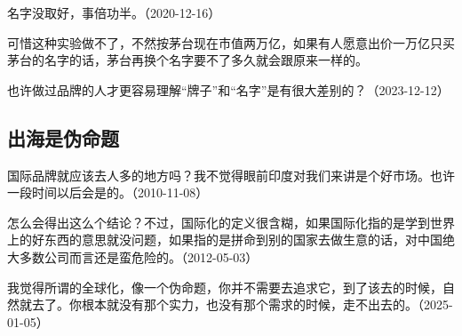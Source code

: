 名字没取好，事倍功半。（2020-12-16）


可惜这种实验做不了，不然按茅台现在市值两万亿，如果有人愿意出价一万亿只买茅台的名字的话，茅台再换个名字要不了多久就会跟原来一样的。

也许做过品牌的人才更容易理解“牌子”和“名字”是有很大差别的？（2023-12-12）

\subsection{出海是伪命题}


国际品牌就应该去人多的地方吗？我不觉得眼前印度对我们来讲是个好市场。也许一段时间以后会是的。（2010-11-08）


怎么会得出这么个结论？不过，国际化的定义很含糊，如果国际化指的是学到世界上的好东西的意思就没问题，如果指的是拼命到别的国家去做生意的话，对中国绝大多数公司而言还是蛮危险的。（2012-05-03）

我觉得所谓的全球化，像一个伪命题，你并不需要去追求它，到了该去的时候，自然就去了。你根本就没有那个实力，也没有那个需求的时候，走不出去的。（2025-01-05）
